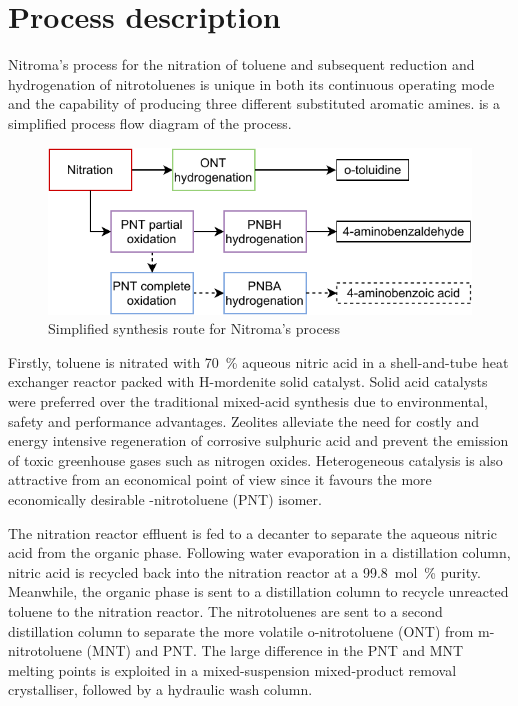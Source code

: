 \section*{Process description}


Nitroma's process for the nitration of toluene and subsequent reduction and hydrogenation of nitrotoluenes is unique in both its continuous operating mode and the capability of producing three different substituted aromatic amines.   is a simplified process flow diagram of the process.

\begin{figure}
    \centering
    \includegraphics[width=0.8\linewidth]{chapters/0-executive-summary/figures/BFD_nitroma-simplifed.pdf}
    \caption{Simplified synthesis route for Nitroma's process}
    \label{fig:BFD-ES}
\end{figure}

Firstly, toluene is nitrated with \SI{70}{\percent} aqueous nitric acid in a shell-and-tube heat exchanger reactor packed with H-mordenite solid catalyst. Solid acid catalysts were preferred over the traditional mixed-acid synthesis due to environmental, safety and performance advantages. Zeolites alleviate the need for costly and energy intensive regeneration of corrosive sulphuric acid and prevent the emission of toxic greenhouse gases such as nitrogen oxides. Heterogeneous catalysis is also attractive from an economical point of view since it favours the more economically desirable \para-nitrotoluene (PNT) isomer. 

The nitration reactor effluent is fed to a decanter to separate the aqueous nitric acid from the organic phase. Following water evaporation in a distillation column, nitric acid is recycled back into the nitration reactor at a \SI{99.8}{mol\percent} purity. Meanwhile, the organic phase is sent to a distillation column to recycle unreacted toluene to the nitration reactor. The nitrotoluenes are sent to a second distillation column to separate the more volatile o-nitrotoluene (ONT) from m-nitrotoluene (MNT) and PNT. The large difference in the PNT and MNT melting points is exploited in a mixed-suspension mixed-product removal crystalliser, followed by a hydraulic wash column.

